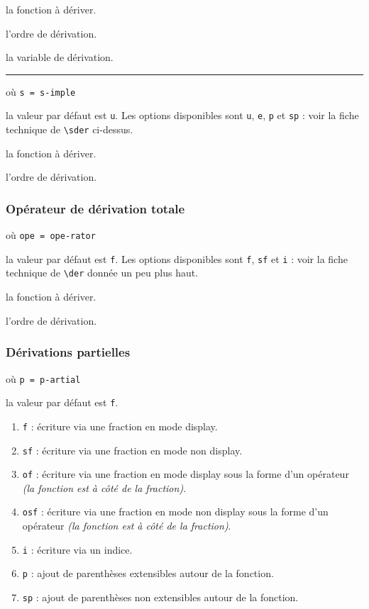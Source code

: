 \documentclass[12pt,a4paper]{article}
\newcommand\env[1]{\texttt{#1}}
\newcommand\macro[1]{\env{\textbackslash{}#1}}
\theoremstyle{definition}
\newcommand\separation{
	\medskip
	\hfill\rule{0.5\textwidth}{0.75pt}\hfill
	\medskip
}
\newcommand\mwhyprefix[2]{%
	\texttt{#1 = #1-#2}%
}
\begin{document}
 la fonction à dériver.

 l'ordre de dérivation.

 la variable de dérivation.


\separation


 où \quad \mwhyprefix{s}{imple}

\IDoption{} la valeur par défaut est \verb+u+. Les options disponibles sont \verb+u+, \verb+e+, \verb+p+ et \verb+sp+ : voir la fiche technique de \macro{sder} ci-dessus.

 la fonction à dériver.

 l'ordre de dérivation.




\subsubsection{Opérateur de dérivation totale}

 où \quad \mwhyprefix{ope}{rator}

\IDoption{} la valeur par défaut est \verb+f+. Les options disponibles sont \verb+f+, \verb+sf+ et \verb+i+ : voir la fiche technique de \macro{der} donnée un peu plus haut.

 la fonction à dériver.

 l'ordre de dérivation.
\subsubsection{Dérivations partielles}

 où \quad \mwhyprefix{p}{artial}

\IDoption{} la valeur par défaut est \verb+f+. 
\begin{enumerate}
	\item \verb+f+ : écriture via une fraction en mode display.

	\item \verb+sf+ : écriture via une fraction en mode non display.

	\item \verb+of+ : écriture via une fraction en mode display sous la forme d'un opérateur \emph{(la fonction est à côté de la fraction)}.

	\item \verb+osf+ : écriture via une fraction en mode non display sous la forme d'un opérateur \emph{(la fonction est à côté de la fraction)}.

	\item \verb+i+ : écriture via un indice.

	\smallskip
	\item \verb+p+ : ajout de parenthèses extensibles autour de la fonction.

	\item \verb+sp+ : ajout de parenthèses non extensibles autour de la fonction.
\end{enumerate}
\end{document}
